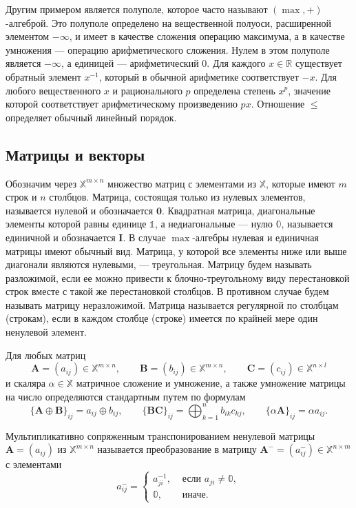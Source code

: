 \documentclass[specialist,
               substylefile = spbu.rtx,
               subf,href,colorlinks=true, 12pt]{disser}
\theoremstyle{definition}
\begin{document}
Другим примером является полуполе, которое часто называют $(\max,+)$-алгеброй. Это полуполе определено на вещественной полуоси, расширенной элементом $-\infty$, и имеет в качестве сложения операцию максимума, а в качестве умножения --- операцию арифметического сложения. Нулем в этом полуполе является $-\infty$, а единицей --- арифметический $0$. Для каждого $x\in\mathbb{R}$ существует обратный элемент $x^{-1}$, который в обычной арифметике соответствует $-x$. Для любого вещественного $x$ и рационального $p$ определена степень $x^{p}$, значение которой соответствует арифметическому произведению $px$. Отношение $\leq$ определяет обычный линейный порядок.

\subsection{Матрицы и векторы}
Обозначим через $\mathbb{X}^{m\times n}$ множество матриц с элементами из $\mathbb{X}$, которые имеют $m$ строк и $n$ столбцов. 
Матрица, состоящая только из нулевых элементов, называется нулевой и обозначается $\bm{0}$. Квадратная матрица, диагональные элементы которой равны единице $\mathbb{1}$, а недиагональные --- нулю $\mathbb{0}$, называется единичной и обозначается $\bm{I}$. В случае $\max$-алгебры нулевая и единичная матрицы имеют обычный вид.  Матрица, у которой все элементы ниже или выше диагонали являются нулевыми, --- треугольная. Матрицу будем называть разложимой, если ее можно привести к блочно-треугольному виду перестановкой строк вместе с такой же перестановкой столбцов. В противном случае будем называть матрицу    неразложимой.
Матрица называется регулярной по столбцам (строкам), если в каждом столбце (строке) имеется по крайней мере один ненулевой элемент.

Для любых матриц 
\begin{equation*}
\bm{A}=(a_{ij})\in\mathbb{X}^{m\times n},
\qquad
\bm{B}=(b_{ij})\in\mathbb{X}^{m\times n},
\qquad
\bm{C}=(c_{ij})\in\mathbb{X}^{n\times l}
\end{equation*} 
и скаляра $\alpha\in\mathbb{X}$ матричное сложение и умножение, а также умножение матрицы на число определяются стандартным путем по формулам
\begin{equation*}
\{
\bm{A}\oplus\bm{B}
\}_{ij}
=
a_{ij}\oplus b_{ij},
\qquad
\{
\bm{B}\bm{C}
\}_{ij}
=
\bigoplus_{k=1}^{n}b_{ik}c_{kj},
\qquad
\{
\alpha\bm{A}
\}_{ij}=\alpha a_{ij}.
\end{equation*}

Мультипликативно сопряженным транспонированием ненулевой матрицы $\bm{A}=(a_{ij})$ из $\mathbb{X}^{m\times n}$ называется преобразование в матрицу $\bm{A}^{-}=(a_{ij}^{-})\in\mathbb{X}^{n\times m}$ с элементами
\begin{equation*}
a_{ij}^{-}=
\begin{cases}
a_{ji}^{-1}, &\text{ если } a_{ji}\neq\mathbb{0},
\\
\mathbb{0}, &\text{ иначе}. 
\end{cases}
\end{equation*}
\end{document}
